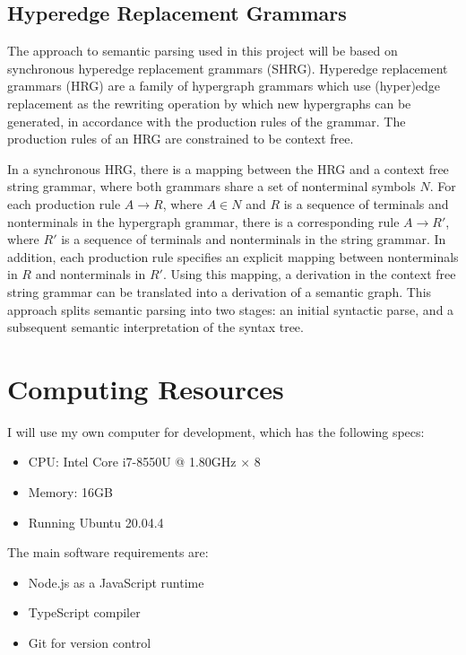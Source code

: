 \documentclass{article}
\begin{document}
\subsection{Hyperedge Replacement Grammars}

The approach to semantic parsing used in this project will be based on synchronous hyperedge replacement grammars (SHRG). Hyperedge replacement grammars (HRG) are a family of hypergraph grammars which use (hyper)edge replacement as the rewriting operation by which new hypergraphs can be generated, in accordance with the production rules of the grammar. The production rules of an HRG are constrained to be context free.

In a synchronous HRG, there is a mapping between the HRG and a context free string grammar, where both grammars share a set of nonterminal symbols $N$. For each production rule $A \rightarrow R$, where $A \in N$ and $R$ is a sequence of terminals and nonterminals in the hypergraph grammar, there is a corresponding rule $A \rightarrow R'$, where $R'$ is a sequence of terminals and nonterminals in the string grammar. In addition, each production rule specifies an explicit mapping between nonterminals in $R$ and nonterminals in $R'$. Using this mapping, a derivation in the context free string grammar can be translated into a derivation of a semantic graph. This approach splits semantic parsing into two stages: an initial syntactic parse, and a subsequent semantic interpretation of the syntax tree.

\section{Computing Resources}

I will use my own computer for development, which has the following specs:
\begin{itemize}
    \item CPU: Intel Core i7-8550U @ 1.80GHz × 8
    \item Memory: 16GB
    \item Running Ubuntu 20.04.4
\end{itemize}
The main software requirements are:
\begin{itemize}
    \item Node.js as a JavaScript runtime
    \item TypeScript compiler
    \item Git for version control
\end{itemize}
\end{document}

